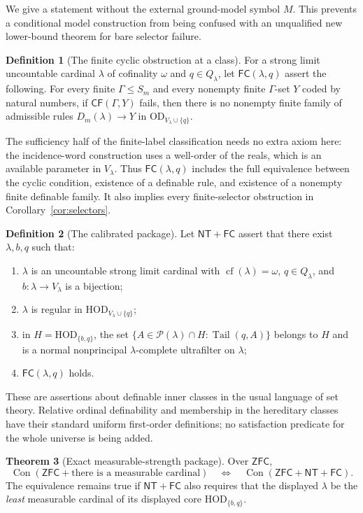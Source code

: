 \documentclass[11pt,letterpaper]{article}
\theoremstyle{definition}
\newtheorem{definition}{Definition}[section]
\newtheorem{theorem}[definition]{Theorem}
\numberwithin{equation}{section}
\newcommand{\ZFC}{\mathsf{ZFC}}
\newcommand{\HOD}{\mathrm{HOD}}
\newcommand{\OD}{\mathrm{OD}}
\newcommand{\Con}{\operatorname{Con}}
\newcommand{\cf}{\operatorname{cf}}
\newcommand{\CF}{\mathsf{CF}}
\newcommand{\tail}{\operatorname{Tail}}
\newcommand{\Inv}{\mathsf{FC}}
\newcommand{\NTFC}{\mathsf{NT+FC}}
\newcommand{\powerset}{\mathcal P}
\begin{document}
We give a statement without the external ground-model symbol $M$.
This prevents a conditional model construction from being confused with
an unqualified new lower-bound theorem for bare selector failure.

\begin{definition}[The finite cyclic obstruction at a class]\label{def:FC}
For a strong limit uncountable cardinal $\lambda$ of cofinality $\omega$
and $q\in Q_\lambda$, let $\Inv(\lambda,q)$ assert the following.
For every finite $\Gamma\le S_m$ and every nonempty finite $\Gamma$-set
$Y$ coded by natural numbers, if $\CF(\Gamma,Y)$ fails, then there is no
nonempty finite family of admissible rules $D_m(\lambda)\to Y$ in
$\OD_{V_\lambda\cup\{q\}}$.
\end{definition}

The sufficiency half of the finite-label classification needs no extra
axiom here: the incidence-word construction uses a well-order of the
reals, which is an available parameter in $V_\lambda$. Thus
$\Inv(\lambda,q)$ includes the full equivalence between the cyclic
condition, existence of a definable rule, and existence of a nonempty
finite definable family. It also implies every finite-selector
obstruction in Corollary~\ref{cor:selectors}.

\begin{definition}[The calibrated package]\label{def:package}
Let $\NTFC$ assert that there exist $\lambda,b,q$ such that:
\begin{enumerate}
\item $\lambda$ is an uncountable strong limit cardinal with
$\cf(\lambda)=\omega$, $q\in Q_\lambda$, and $b:\lambda\to V_\lambda$
is a bijection;
\item $\lambda$ is regular in $\HOD_{V_\lambda\cup\{q\}}$;
\item in $H=\HOD_{\{b,q\}}$, the set
$\{A\in\powerset(\lambda)\cap H:\tail(q,A)\}$ belongs to $H$ and is a
normal nonprincipal $\lambda$-complete ultrafilter on $\lambda$;
\item $\Inv(\lambda,q)$ holds.
\end{enumerate}
These are assertions about definable inner classes in the usual language
of set theory. Relative ordinal definability and membership in the
hereditary classes have their standard uniform first-order definitions;
no satisfaction predicate for the whole universe is being added.
\end{definition}

\begin{theorem}[Exact measurable-strength package]\label{thm:consistency}
Over $\ZFC$,
\[
 \Con(\ZFC+\text{there is a measurable cardinal})
 \quad\Longleftrightarrow\quad
 \Con(\ZFC+\NTFC).
\]
The equivalence remains true if $\NTFC$ also requires that the displayed
$\lambda$ be the \emph{least} measurable cardinal of its displayed core
$\HOD_{\{b,q\}}$.
\end{theorem}
\end{document}

